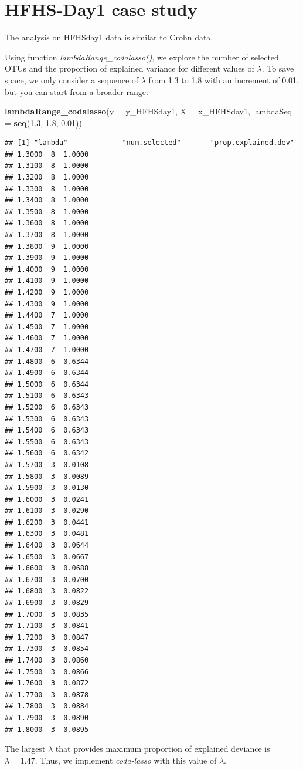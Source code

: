 \documentclass[openany]{book}
\newenvironment{Shaded}{\begin{snugshade}}{\end{snugshade}}
\newcommand{\KeywordTok}[1]{\textcolor[rgb]{0.13,0.29,0.53}{\textbf{#1}}}
\newcommand{\DataTypeTok}[1]{\textcolor[rgb]{0.13,0.29,0.53}{#1}}
\newcommand{\FloatTok}[1]{\textcolor[rgb]{0.00,0.00,0.81}{#1}}
\newcommand{\NormalTok}[1]{#1}
\begin{document}
\section{HFHS-Day1 case study}\label{hfhs-day1-case-study-2}

The analysis on HFHSday1 data is similar to Crohn data.

Using function \emph{lambdaRange\_codalasso()}, we explore the number of
selected OTUs and the proportion of explained variance for different
values of \(\lambda\). To save space, we only consider a sequence of
\(\lambda\) from 1.3 to 1.8 with an increment of 0.01, but you can start
from a broader range:

\begin{Shaded}
\begin{Highlighting}[]
\KeywordTok{lambdaRange_codalasso}\NormalTok{(}\DataTypeTok{y =}\NormalTok{ y_HFHSday1, }\DataTypeTok{X =}\NormalTok{ x_HFHSday1, }\DataTypeTok{lambdaSeq =} \KeywordTok{seq}\NormalTok{(}\FloatTok{1.3}\NormalTok{, }\FloatTok{1.8}\NormalTok{, }\FloatTok{0.01}\NormalTok{))}
\end{Highlighting}
\end{Shaded}

\begin{verbatim}
## [1] "lambda"             "num.selected"       "prop.explained.dev"
## 1.3000  8  1.0000
## 1.3100  8  1.0000
## 1.3200  8  1.0000
## 1.3300  8  1.0000
## 1.3400  8  1.0000
## 1.3500  8  1.0000
## 1.3600  8  1.0000
## 1.3700  8  1.0000
## 1.3800  9  1.0000
## 1.3900  9  1.0000
## 1.4000  9  1.0000
## 1.4100  9  1.0000
## 1.4200  9  1.0000
## 1.4300  9  1.0000
## 1.4400  7  1.0000
## 1.4500  7  1.0000
## 1.4600  7  1.0000
## 1.4700  7  1.0000
## 1.4800  6  0.6344
## 1.4900  6  0.6344
## 1.5000  6  0.6344
## 1.5100  6  0.6343
## 1.5200  6  0.6343
## 1.5300  6  0.6343
## 1.5400  6  0.6343
## 1.5500  6  0.6343
## 1.5600  6  0.6342
## 1.5700  3  0.0108
## 1.5800  3  0.0089
## 1.5900  3  0.0130
## 1.6000  3  0.0241
## 1.6100  3  0.0290
## 1.6200  3  0.0441
## 1.6300  3  0.0481
## 1.6400  3  0.0644
## 1.6500  3  0.0667
## 1.6600  3  0.0688
## 1.6700  3  0.0700
## 1.6800  3  0.0822
## 1.6900  3  0.0829
## 1.7000  3  0.0835
## 1.7100  3  0.0841
## 1.7200  3  0.0847
## 1.7300  3  0.0854
## 1.7400  3  0.0860
## 1.7500  3  0.0866
## 1.7600  3  0.0872
## 1.7700  3  0.0878
## 1.7800  3  0.0884
## 1.7900  3  0.0890
## 1.8000  3  0.0895
\end{verbatim}

The largest \(\lambda\) that provides maximum proportion of explained
deviance is \(\lambda = 1.47\). Thus, we implement \emph{coda-lasso}
with this value of \(\lambda\).
\end{document}

